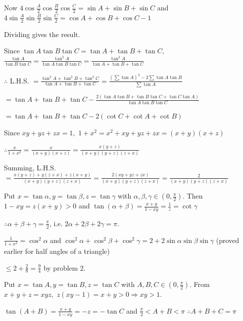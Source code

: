   Now $4\cos\frac{A}{2}\cos\frac{B}{2}\cos\frac{C}{2} = \sin A + \sin B + \sin C$ and
  $4\sin\frac{A}{2}\sin\frac{B}{2}\sin\frac{C}{2} = \cos A + \cos B + \cos C - 1$

  Dividing gives the result.

\item Since $\tan A\tan B\tan C = \tan A + \tan B + \tan C,$ $\frac{\tan A}{\tan B\tan C} = \frac{\tan^2A}{\tan A\tan
  B\tan C} = \frac{\tan^2A}{\tan A + \tan B + \tan C}$

  $\therefore$ L.H.S. $= \frac{\tan^2A + \tan^2B + \tan^2C}{\tan A + \tan B + \tan C} = \frac{(\sum\tan A)^2 - 2\sum\tan
  A\tan B}{\sum\tan A}$

  $= \tan A + \tan B + \tan C - \frac{2(\tan A\tan B + \tan B\tan C + \tan C\tan A)}{\tan A\tan B\tan C}$

  $= \tan A + \tan B + \tan C - 2(\cot C + \cot A + \cot B)$

\item Since $xy + yz + zx = 1,$ $1 + x^2 = x^2 + xy + yz + zx = (x + y)(x + z)$

  $\therefore \frac{x}{1 + x^2} = \frac{x}{(x + y)(x + z)} = \frac{x(y + z)}{(x + y)(y + z)(z + x)}$

  Summing, L.H.S. $= \frac{x(y + z) + y(z + x) + z(x + y)}{(x + y)(y + z)(z + x)} = \frac{2(xy + yz + zx)}{(x + y)(y +
    z)(z + x)} = \frac{2}{(x + y)(y + z)(z + x)}$

\item Put $x = \tan\alpha, y = \tan\beta, z = \tan\gamma$ with $\alpha, \beta, \gamma \in \left(0, \frac{\pi}{2}\right)$.
  Then $1 - xy = z(x + y) > 0$ and $\tan(\alpha + \beta) = \frac{x + y}{1 - xy} = \frac{1}{z} = \cot\gamma$

  $\therefore \alpha + \beta + \gamma = \frac{\pi}{2}$, i.e. $2\alpha + 2\beta + 2\gamma = \pi$.

  $\frac{1}{1 + x^2} = \cos^2\alpha$ and $\cos^2\alpha + \cos^2\beta + \cos^2\gamma = 2 + 2\sin\alpha\sin\beta\sin\gamma$
  (proved earlier for half angles of a triangle)

  $\leq 2 + \frac{2}{8} = \frac{9}{4}$ by problem 2.

\item Put $x = \tan A, y = \tan B, z = \tan C$ with $A, B, C \in \left(0, \frac{\pi}{2}\right)$. From $x + y + z =
  xyz,$ $z(xy - 1) = x + y > 0 \Rightarrow xy > 1$.

  $\tan(A + B) = \frac{x + y}{1 - xy} = -z = -\tan C$ and $\frac{\pi}{2} < A + B < \pi$ $\therefore A + B + C = \pi$


